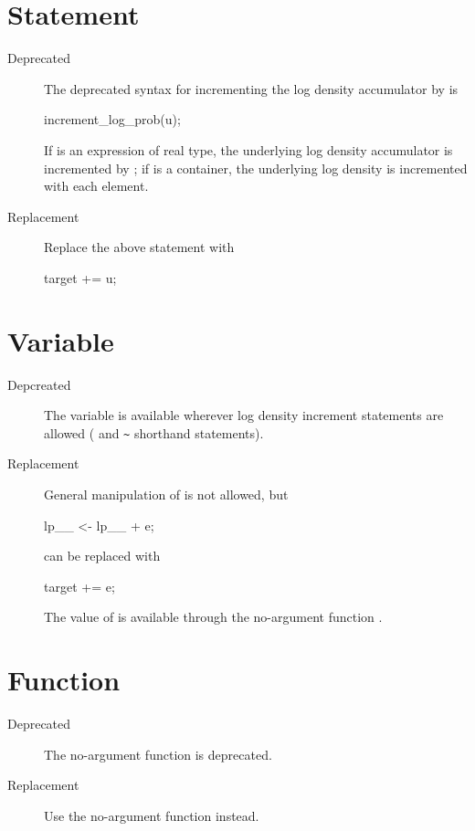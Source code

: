 \section{ Statement}

\begin{description}
\item[Deprecated] The deprecated syntax for incrementing the log
  density accumulator by  is
\begin{stancode}
increment_log_prob(u);
\end{stancode}
If  is an expression of real type, the underlying log density
accumulator is incremented by ;  if  is a container,
the underlying log density is incremented with each element.
\item[Replacement] Replace the above statement with
\begin{stancode}
target += u;
\end{stancode}
\end{description}

\section{ Variable}

\begin{description}
\item[Depcreated]
The variable  is available wherever log density increment
statements are allowed ( and \Verb|~| shorthand
statements).
\item[Replacement]
General manipulation of  is not allowed, but
\begin{stancode}
lp__ <- lp__ + e;
\end{stancode}
%
can be replaced with
%
\begin{stancode}
target += e;
\end{stancode}
%
The value of  is available through the no-argument
function .
\end{description}

\section{ Function}

\begin{description}
\item[Deprecated]
The no-argument function  is deprecated.
\item[Replacement]
Use the no-argument function  instead.
\end{description}

